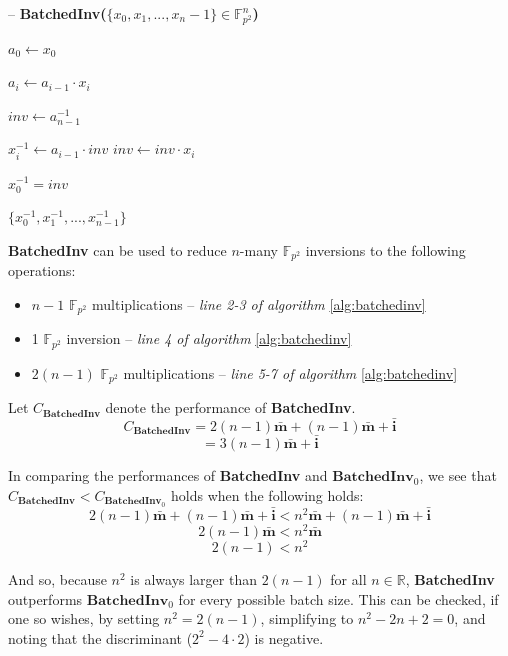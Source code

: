 \begin{algorithm}
\caption{-- \textbf{BatchedInv($\{x_0, x_1, ..., x_n-1\} \in \mathbb{F}_{p^{2}}^{n}$)}}\label{alg:batchedinv}
\begin{algorithmic}[1]
\State $a_0 \gets x_0$

	\State $a_i \gets a_{i-1} \cdot x_i$
\EndFor

\State $inv \gets a_{n-1}^{-1}$

	\State $x_i^{-1} \gets a_{i-1} \cdot inv$
	\State $inv \gets inv \cdot x_{i}$
\EndFor

\State $x_0^{-1} = inv$

\State \Return $\{x_0^{-1}, x_1^{-1}, ..., x_{n-1}^{-1}\}$

\end{algorithmic}
\end{algorithm}

\textbf{BatchedInv} can be used to reduce $n$-many $\mathbb{F}_{p^{2}}$ inversions to the following operations:

\begin{center}
\begin{itemize}
\item $n-1$ $\mathbb{F}_{p^2}$ multiplications -- \emph{line 2-3 of algorithm} \ref{alg:batchedinv}
\item 1 $\mathbb{F}_{p^2}$ inversion -- \emph{line 4 of algorithm} \ref{alg:batchedinv}
\item $2(n-1)$ $\mathbb{F}_{p^2}$ multiplications -- \emph{line 5-7 of algorithm} \ref{alg:batchedinv}
\end{itemize}
\end{center}

\noindent
Let $C_{\textbf{BatchedInv}}$ denote the performance of \textbf{BatchedInv}. 
$$
C_{\textbf{BatchedInv}} = 2(n-1)\bar{\textbf{m}} + (n-1)\bar{\textbf{m}} + \bar{\textbf{i}}
$$
$$
= 3(n-1)\bar{\textbf{m}} + \bar{\textbf{i}}
$$

In comparing the performances of \textbf{BatchedInv} and $\textbf{BatchedInv}_0$, we see that $C_{\textbf{BatchedInv}} < C_{\textbf{BatchedInv}_0}$ holds when the following holds:
$$
2(n-1)\bar{\textbf{m}} + (n-1)\bar{\textbf{m}} + \bar{\textbf{i}} < n^2\bar{\textbf{m}} + (n-1)\bar{\textbf{m}} + \bar{\textbf{i}}
$$
$$
2(n-1)\bar{\textbf{m}} < n^2\bar{\textbf{m}}
$$
$$
2(n-1) < n^2
$$

And so, because $n^2$ is always larger than $2(n-1)$ for all $n \in \mathbb{R}$, \textbf{BatchedInv} outperforms $\textbf{BatchedInv}_0$ for every possible batch size. This can be checked, if one so wishes, by setting $n^2 = 2(n-1)$, simplifying to $n^2 - 2n + 2 = 0$, and noting that the discriminant ($2^2 - 4\cdot 2$) is negative. 

